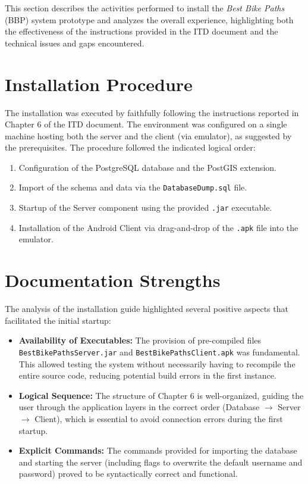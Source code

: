 This section describes the activities performed to install the \textit{Best Bike Paths} (BBP) system prototype and analyzes the overall experience, highlighting both the effectiveness of the instructions provided in the ITD document and the technical issues and gaps encountered.

\section{Installation Procedure}

The installation was executed by faithfully following the instructions reported in Chapter 6 of the ITD document. The environment was configured on a single machine hosting both the server and the client (via emulator), as suggested by the prerequisites.
The procedure followed the indicated logical order:

\begin{enumerate}
    \item Configuration of the PostgreSQL database and the PostGIS extension.
    \item Import of the schema and data via the \texttt{DatabaseDump.sql} file.
    \item Startup of the Server component using the provided \texttt{.jar} executable.
    \item Installation of the Android Client via drag-and-drop of the \texttt{.apk} file into the emulator.
\end{enumerate}

\section{Documentation Strengths}

The analysis of the installation guide highlighted several positive aspects that facilitated the initial startup:

\begin{itemize}
    \item \textbf{Availability of Executables:} The provision of pre-compiled files \texttt{BestBikePathsServer.jar} and \texttt{BestBikePathsClient.apk} was fundamental. This allowed testing the system without necessarily having to recompile the entire source code, reducing potential build errors in the first instance.
    \item \textbf{Logical Sequence:} The structure of Chapter 6 is well-organized, guiding the user through the application layers in the correct order (Database $\rightarrow$ Server $\rightarrow$ Client), which is essential to avoid connection errors during the first startup.
    \item \textbf{Explicit Commands:} The commands provided for importing the database and starting the server (including flags to overwrite the default username and password) proved to be syntactically correct and functional.
\end{itemize}

